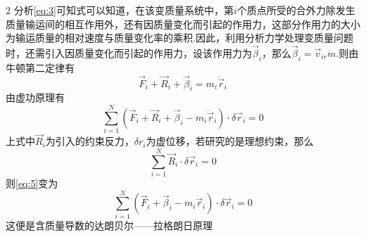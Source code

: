 \documentclass[12pt,twoside]{article}
\numberwithin{equation}{section}    %
\begin{document}
\begin{multicols}{2}
    分析\eqref{eq:3}可知式可以知道，在该变质量系统中，第$i$个质点所受的合外力除发生质量输运间的相互作用外，还有因质量变化而引起的作用力，这部分作用力的大小为输运质量的相对速度与质量变化率的乘积.因此，利用分析力学处理变质量问题时，还需引入因质量变化而引起的作用力，设该作用力为$\vec{\beta}_i$，那么$\vec{\beta}_i=\vec{v}_{ir}\dot{m}$.则由牛顿第二定律有
    \begin{equation}
        \vec{F}_i+\vec{R}_i+\vec{\beta}_i=m_i\ddot{\vec{r}}_i
        \label{eq:4}
    \end{equation}
    由虚功原理有
    \begin{equation}
        \sum_{i=1}^N{\left( \vec{F}_i+\vec{R}_i+\vec{\beta}_i-m_i\ddot{\vec{r}}_i \right) \cdot \delta \vec{r}_i}=0
        \label{eq:5}
    \end{equation}
    上式中$\vec{R}_i$为引入的约束反力，$\delta r_i$为虚位移，若研究的是理想约束，那么
    \[
    \sum_{i=1}^N{\vec{R}_i\cdot \delta \vec{r}_i}=0
    \]
    则\eqref{eq:5}变为
    \begin{equation}
        \sum_{i=1}^N{\left( \vec{F}_i+\vec{\beta}_i-m_i\ddot{\vec{r}}_i \right) \cdot \delta \vec{r}_i}=0
        \label{eq:6}
    \end{equation}
    这便是含质量导数的达朗贝尔——拉格朗日原理

\end{multicols}
\end{document}
